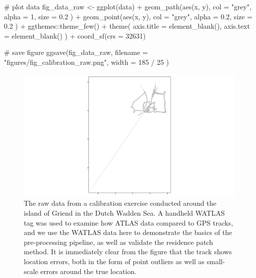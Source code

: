 \documentclass[]{scrreprt}
\newenvironment{Shaded}{}{}
\newcommand{\CommentTok}[1]{\textcolor[rgb]{0.00,0.50,0.00}{#1}}
\newcommand{\DataTypeTok}[1]{#1}
\newcommand{\DecValTok}[1]{#1}
\newcommand{\FloatTok}[1]{#1}
\newcommand{\KeywordTok}[1]{\textcolor[rgb]{0.00,0.00,1.00}{#1}}
\newcommand{\NormalTok}[1]{#1}
\newcommand{\OperatorTok}[1]{#1}
\newcommand{\StringTok}[1]{\textcolor[rgb]{0.00,0.50,0.50}{#1}}
\begin{document}
\begin{Shaded}
\begin{Highlighting}[]
\CommentTok{# plot data}
\NormalTok{fig_data_raw <-}
\StringTok{  }\KeywordTok{ggplot}\NormalTok{(data) }\OperatorTok{+}
\StringTok{  }\KeywordTok{geom_path}\NormalTok{(}\KeywordTok{aes}\NormalTok{(x, y),}
    \DataTypeTok{col =} \StringTok{"grey"}\NormalTok{, }\DataTypeTok{alpha =} \DecValTok{1}\NormalTok{, }\DataTypeTok{size =} \FloatTok{0.2}
\NormalTok{  ) }\OperatorTok{+}
\StringTok{  }\KeywordTok{geom_point}\NormalTok{(}\KeywordTok{aes}\NormalTok{(x, y),}
    \DataTypeTok{col =} \StringTok{"grey"}\NormalTok{, }\DataTypeTok{alpha =} \FloatTok{0.2}\NormalTok{, }\DataTypeTok{size =} \FloatTok{0.2}
\NormalTok{  ) }\OperatorTok{+}
\StringTok{  }\NormalTok{ggthemes}\OperatorTok{::}\KeywordTok{theme_few}\NormalTok{() }\OperatorTok{+}
\StringTok{  }\KeywordTok{theme}\NormalTok{(}
    \DataTypeTok{axis.title =} \KeywordTok{element_blank}\NormalTok{(),}
    \DataTypeTok{axis.text =} \KeywordTok{element_blank}\NormalTok{()}
\NormalTok{  ) }\OperatorTok{+}
\StringTok{  }\KeywordTok{coord_sf}\NormalTok{(}\DataTypeTok{crs =} \DecValTok{32631}\NormalTok{)}

\CommentTok{# save figure}
\KeywordTok{ggsave}\NormalTok{(fig_data_raw,}
  \DataTypeTok{filename =} \StringTok{"figures/fig_calibration_raw.png"}\NormalTok{,}
  \DataTypeTok{width =} \DecValTok{185} \OperatorTok{/}\StringTok{ }\DecValTok{25}
\NormalTok{)}
\end{Highlighting}
\end{Shaded}

\begin{figure}
\centering
\includegraphics{figures/fig_calibration_raw.png}
\caption{The raw data from a calibration exercise conducted around the island of Griend in the Dutch Wadden Sea. A handheld WATLAS tag was used to examine how ATLAS data compared to GPS tracks, and we use the WATLAS data here to demonstrate the basics of the pre-processing pipeline, as well as validate the residence patch method. It is immediately clear from the figure that the track shows location errors, both in the form of point outliers as well as small-scale errors around the true location.}
\end{figure}
\end{document}
